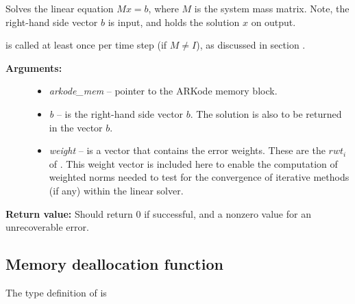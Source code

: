 \documentclass[letterpaper,10pt,english]{sphinxmanual}
\begin{document}
\begin{fulllineitems}
\label{linear_solvers/custom:c.msolve}
Solves the linear equation \(M x = b\), where \(M\) is the
system mass matrix.  Note, the right-hand side vector \(b\) is
input, and holds the solution \(x\) on output.

{\hyperref[linear_solvers/custom:c.msolve]{\emph{}}} is called at least once per time step (if
\(M\ne I\)), as discussed in section {\hyperref[Mathematics:mathematics-masssolve]{\emph{}}}.
\begin{description}
\item[{\textbf{Arguments:}}] \leavevmode\begin{itemize}
\item {} 
\emph{arkode\_mem} -- pointer to the ARKode memory block.

\item {} 
\emph{b} -- is the right-hand side vector \(b\). The solution
is also to be returned in the vector \(b\).

\item {} 
\emph{weight} -- is a vector that contains the error weights. These
are the \(rwt_i\) of {\hyperref[c_interface/User_supplied:cinterface-residualweight]{\emph{}}}.
This weight vector is included here to enable the computation
of weighted norms needed to test for the convergence of
iterative methods (if any) within the linear solver.

\end{itemize}

\end{description}

\textbf{Return value:}  Should return 0 if successful, and a nonzero
value for an unrecoverable error.

\end{fulllineitems}



\subsection{Memory deallocation function}
\label{linear_solvers/custom:memory-deallocation-function}
The type definition of {\hyperref[linear_solvers/custom:c.lfree]{\emph{}}} is
\end{document}
